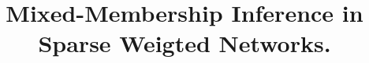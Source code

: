 \documentclass[a4paper, 12pt]{article}
\title{Mixed-Membership Inference in Sparse Weigted Networks.}
\begin{document}
	
\maketitle
\begin{abstract}
\end{abstract}





\clearpage




\appendix
\end{document}
